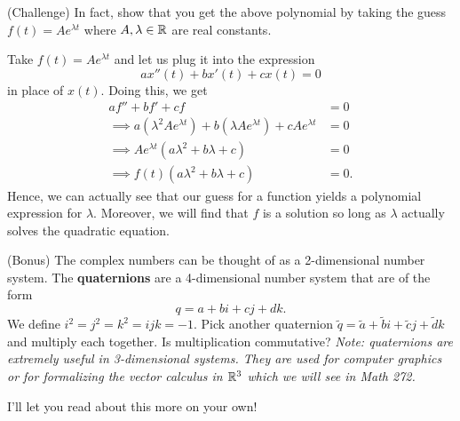 \documentclass[12pt]{article} %
\begin{document}
\begin{problem} 
(Challenge) In fact, show that you get the above polynomial by taking the guess $f(t)=Ae^{\lambda t}$ where $A,\lambda \in \mathbb{R}$ are real constants.
\end{problem}
\begin{solution}
Take $f(t)=Ae^{\lambda t}$ and let us plug it into the expression 
\[
ax''(t)+bx'(t)+cx(t)=0
\]
in place of $x(t)$. Doing this, we get
\begin{align*}
af''+bf'+cf&=0\\
\implies a(\lambda^2 Ae^{\lambda t})+b(\lambda Ae^{\lambda t}) + c Ae^{\lambda t} &=0\\
\implies Ae^{\lambda t} ( a\lambda^2 + b\lambda + c)&=0\\
\implies f(t)( a\lambda^2 + b\lambda + c)&=0.
\end{align*}
Hence, we can actually see that our guess for a function yields a polynomial expression for $\lambda$. Moreover, we will find that $f$ is a solution so long as $\lambda$ actually solves the quadratic equation.
\end{solution}

\newpage

\begin{problem}
(Bonus) The complex numbers can be thought of as a 2-dimensional number system. The \textbf{quaternions} are a 4-dimensional number system that are of the form
\[
q = a+bi+cj+dk.
\]
We define $i^2=j^2=k^2=ijk=-1$. Pick another quaternion $\tilde{q}=\tilde{a}+\tilde{b}i+\tilde{c}j+\tilde{d}k$ and multiply each together. Is multiplication commutative? \emph{Note: quaternions are extremely useful in 3-dimensional systems. They are used for computer graphics or for formalizing the vector calculus in $\mathbb{R}^3$ which we will see in Math 272.}
\end{problem}
\begin{solution}
I'll let you read about this more on your own!
\end{solution}
\end{document}
